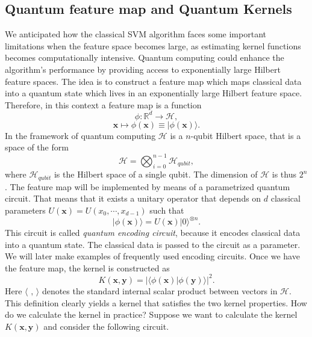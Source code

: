 \documentclass[12pt]{article}
\begin{document}
\subsection{Quantum feature map and Quantum Kernels}
We anticipated how the classical SVM algorithm faces some important limitations when the feature space becomes large, as estimating kernel functions becomes computationally intensive. Quantum computing could enhance the algorithm's performance by providing access to exponentially large Hilbert feature spaces. The idea is to construct a feature map which maps classical data into a quantum state which lives in an exponentially large Hilbert feature space. Therefore, in this context a feature map is a function 
\begin{equation}
    \phi: \mathbb{R}^d \rightarrow \mathcal{H},
\end{equation}
$$\mathbf{x}\mapsto \phi(\mathbf{x})\equiv |\phi(\mathbf{x})\rangle.$$
In the framework of quantum computing $\mathcal{H}$ is a $n$-qubit Hilbert space, that is a space of the form
\begin{equation}
    \mathcal{H}=\bigotimes_{i=0}^{n-1} \mathcal{H}_{qubit},
\end{equation}
where $\mathcal{H}_{qubit}$ is the Hilbert space of a single qubit. The dimension of $\mathcal{H}$ is thus $2^n$. The feature map will be implemented by means of a parametrized quantum circuit. That means that it exists a unitary operator that depends on $d$ classical parameters $U(\mathbf{x})=U(x_0,\cdots, x_{d-1})$ such that 
\begin{equation}
    |\phi(\mathbf{x})\rangle=U(\mathbf{x})|0\rangle^{\otimes n}.
\end{equation}
This circuit is called \textit{quantum encoding circuit}, because it encodes classical data into a quantum state. The classical data is passed to the circuit as a parameter. We will later make examples of frequently used encoding circuits. 
Once we have the feature map, the kernel is constructed as 
\begin{equation}
    K(\mathbf{x}, \mathbf{y})=\left | \langle \phi(\mathbf{x})|\phi(\mathbf{y})\rangle \right |^2.
\end{equation}
Here $\langle\,\,, \,\rangle$ denotes the standard internal scalar product between vectors in $\mathcal{H}$. This definition clearly yields a kernel that satisfies the two kernel properties. How do we calculate the kernel in practice? Suppose we want to calculate the kernel $K(\mathbf{x}, \mathbf{y})$ and consider the following circuit. 
\end{document}
